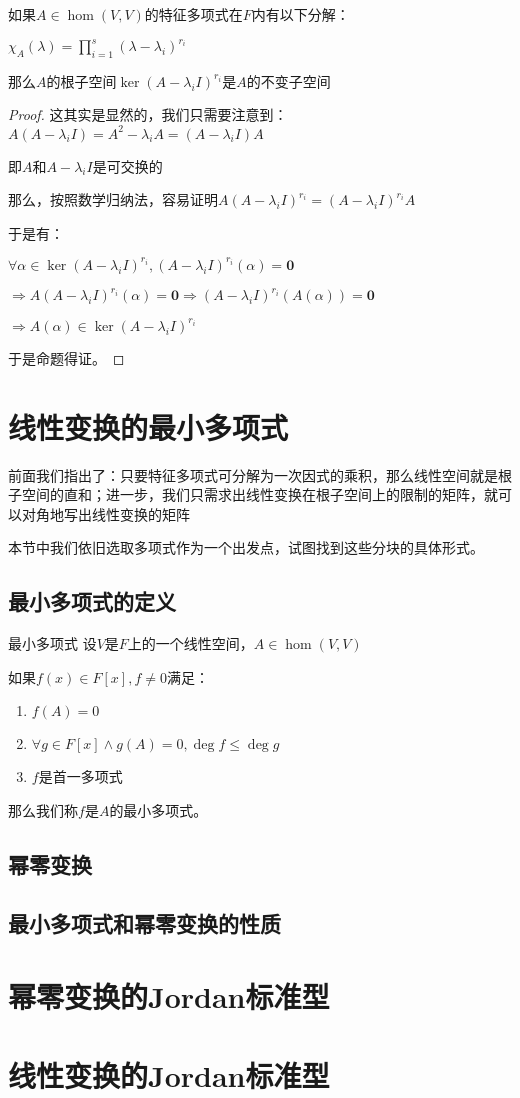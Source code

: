 \documentclass[12pt, a4paper, oneside, UTF8]{ctexbook}
\begin{document}
\begin{para}{0}
\begin{proposition}
						如果$A \in \hom(V,V)$的特征多项式在$F$内有以下分解：

						$\chi_A (\lambda )=\prod\limits_{i=1}^{s} (\lambda-\lambda_i)^{r_i}$

						那么$A$的根子空间$\ker (A-\lambda_iI)^{r_i}$是$A$的不变子空间
					\end{proposition}
					\begin{proof}
						这其实是显然的，我们只需要注意到：$A(A-\lambda_i I)=A^2 - \lambda_i A = (A-\lambda_i I)A$
						
						即$A$和$A-\lambda_i I$是可交换的

						那么，按照数学归纳法，容易证明$A(A-\lambda_i I)^{r_i}=(A-\lambda_i I)^{r_i}A$

						于是有：

						$\forall \alpha \in \ker (A-\lambda_iI)^{r_i},(A-\lambda_iI)^{r_i}(\alpha )=\mathbf{0}$

						$\Rightarrow A(A-\lambda_iI)^{r_i}(\alpha )=\mathbf{0} \Rightarrow (A-\lambda_iI)^{r_i}(A(\alpha )) = \mathbf{0}$

						$\Rightarrow A(\alpha ) \in \ker (A-\lambda_iI)^{r_i}$

						于是命题得证。
					\end{proof}
			\end{para}
	\section{线性变换的最小多项式}
		前面我们指出了：只要特征多项式可分解为一次因式的乘积，那么线性空间就是根子空间的直和；进一步，我们只需求出线性变换在根子空间上的限制的矩阵，就可以对角地写出线性变换的矩阵

		本节中我们依旧选取多项式作为一个出发点，试图找到这些分块的具体形式。
		\subsection{最小多项式的定义}
			\begin{defn}{最小多项式}{}
				设$V$是$F$上的一个线性空间，$A \in \hom(V,V)$

				如果$f(x) \in F[x],f \neq 0$满足：

				\begin{enumerate}
					\item $f(A) = 0$
					\item $\forall g \in F[x] \wedge g(A) = 0,\operatorname{deg} f \leqslant \operatorname{deg} g$
					\item $f$是首一多项式
				\end{enumerate}
				那么我们称$f$是$A$的最小多项式。
			\end{defn}
		\subsection{幂零变换}
		\subsection{最小多项式和幂零变换的性质}
	\section{幂零变换的Jordan标准型}
	\section{线性变换的Jordan标准型}
\ifx\allfiles\undefined
\end{document}
